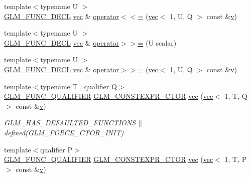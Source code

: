 \begin{DoxyCompactItemize}
\item 
{\footnotesize template$<$typename U $>$ }\\\hyperlink{setup_8hpp_ab2d052de21a70539923e9bcbf6e83a51}{G\+L\+M\+\_\+\+F\+U\+N\+C\+\_\+\+D\+E\+CL} \hyperlink{structglm_1_1vec}{vec} \& \hyperlink{structglm_1_1vec_3_011_00_01_t_00_01_q_01_4_ad853df2a061ac3e3676e34dfd1f7afd8}{operator$<$$<$=} (\hyperlink{structglm_1_1vec}{vec}$<$ 1, U, Q $>$ const \&\hyperlink{_s_d_l__opengl_8h_a10a82eabcb59d2fcd74acee063775f90}{v})
\item 
{\footnotesize template$<$typename U $>$ }\\\hyperlink{setup_8hpp_ab2d052de21a70539923e9bcbf6e83a51}{G\+L\+M\+\_\+\+F\+U\+N\+C\+\_\+\+D\+E\+CL} \hyperlink{structglm_1_1vec}{vec} \& \hyperlink{structglm_1_1vec_3_011_00_01_t_00_01_q_01_4_ad2dbafc1f534fa390f9d50a910c20abb}{operator$>$$>$=} (U scalar)
\item 
{\footnotesize template$<$typename U $>$ }\\\hyperlink{setup_8hpp_ab2d052de21a70539923e9bcbf6e83a51}{G\+L\+M\+\_\+\+F\+U\+N\+C\+\_\+\+D\+E\+CL} \hyperlink{structglm_1_1vec}{vec} \& \hyperlink{structglm_1_1vec_3_011_00_01_t_00_01_q_01_4_a0b53de5663c96aec88f8ae0ab35ff4cd}{operator$>$$>$=} (\hyperlink{structglm_1_1vec}{vec}$<$ 1, U, Q $>$ const \&\hyperlink{_s_d_l__opengl_8h_a10a82eabcb59d2fcd74acee063775f90}{v})
\item 
{\footnotesize template$<$typename T , qualifier Q$>$ }\\\hyperlink{setup_8hpp_a33fdea6f91c5f834105f7415e2a64407}{G\+L\+M\+\_\+\+F\+U\+N\+C\+\_\+\+Q\+U\+A\+L\+I\+F\+I\+ER} \hyperlink{setup_8hpp_ad34178a09666081abdb573c14d1f4a5a}{G\+L\+M\+\_\+\+C\+O\+N\+S\+T\+E\+X\+P\+R\+\_\+\+C\+T\+OR} \hyperlink{structglm_1_1vec_3_011_00_01_t_00_01_q_01_4_acf2830b0c38c9707dcda85083f1c93ba}{vec} (\hyperlink{structglm_1_1vec}{vec}$<$ 1, T, Q $>$ const \&\hyperlink{_s_d_l__opengl_8h_a10a82eabcb59d2fcd74acee063775f90}{v})
\begin{DoxyCompactList}\small\item\em G\+L\+M\+\_\+\+H\+A\+S\+\_\+\+D\+E\+F\+A\+U\+L\+T\+E\+D\+\_\+\+F\+U\+N\+C\+T\+I\+O\+NS $\vert$$\vert$ defined(\+G\+L\+M\+\_\+\+F\+O\+R\+C\+E\+\_\+\+C\+T\+O\+R\+\_\+\+I\+N\+I\+T) \end{DoxyCompactList}\item 
{\footnotesize template$<$qualifier P$>$ }\\\hyperlink{setup_8hpp_a33fdea6f91c5f834105f7415e2a64407}{G\+L\+M\+\_\+\+F\+U\+N\+C\+\_\+\+Q\+U\+A\+L\+I\+F\+I\+ER} \hyperlink{setup_8hpp_ad34178a09666081abdb573c14d1f4a5a}{G\+L\+M\+\_\+\+C\+O\+N\+S\+T\+E\+X\+P\+R\+\_\+\+C\+T\+OR} \hyperlink{structglm_1_1vec_3_011_00_01_t_00_01_q_01_4_a65d7b47aa379986d75f0e64f7141f5d0}{vec} (\hyperlink{structglm_1_1vec}{vec}$<$ 1, T, P $>$ const \&\hyperlink{_s_d_l__opengl_8h_a10a82eabcb59d2fcd74acee063775f90}{v})

\end{DoxyCompactItemize}
